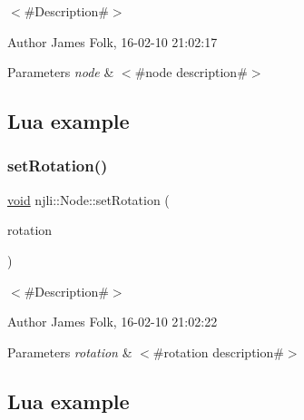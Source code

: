 $<$\#\+Description\#$>$ 

\begin{DoxyAuthor}{Author}
James Folk, 16-\/02-\/10 21\+:02\+:17
\end{DoxyAuthor}

\begin{DoxyParams}{Parameters}
{\em node} & $<$\#node description\#$>$\\
\hline
\end{DoxyParams}
\hypertarget{classnjli_1_1_steering_behavior_wander_ex1}{}\subsection{Lua example}\label{classnjli_1_1_steering_behavior_wander_ex1}

\begin{DoxyCodeInclude}
\end{DoxyCodeInclude}
\mbox{\label{classnjli_1_1_node_a81bfccbe8ff15eed2fb694c018910184}} 
\subsubsection{\texorpdfstring{set\+Rotation()}{setRotation()}}
{\footnotesize\ttfamily \mbox{\hyperlink{_thread_8h_af1e856da2e658414cb2456cb6f7ebc66}{void}} njli\+::\+Node\+::set\+Rotation (\begin{DoxyParamCaption}\item[{const bt\+Quaternion \&}]{rotation }\end{DoxyParamCaption})}



$<$\#\+Description\#$>$ 

\begin{DoxyAuthor}{Author}
James Folk, 16-\/02-\/10 21\+:02\+:22
\end{DoxyAuthor}

\begin{DoxyParams}{Parameters}
{\em rotation} & $<$\#rotation description\#$>$\\
\hline
\end{DoxyParams}
\hypertarget{classnjli_1_1_steering_behavior_wander_ex1}{}\subsection{Lua example}\label{classnjli_1_1_steering_behavior_wander_ex1}

